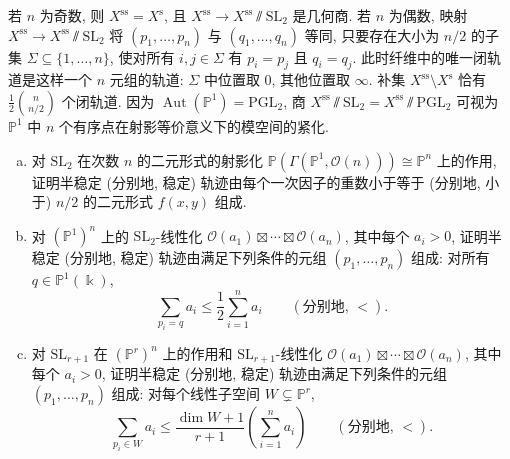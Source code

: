 \begin{example}
若 $n$ 为奇数, 则 $X^{\mathrm{ss}}=X^{\mathrm s}$, 且 $X^{\mathrm{ss}}\to X^{\mathrm{ss}}\sslash\mathrm{SL}_2$ 是几何商. 若 $n$ 为偶数, 映射 $X^{\mathrm{ss}}\to X^{\mathrm{ss}}\sslash\mathrm{SL}_2$ 将 $(p_1,\ldots,p_n)$ 与 $(q_1,\ldots,q_n)$ 等同, 只要存在大小为 $n/2$ 的子集 $\Sigma\subseteq\{1,\ldots,n\}$, 使对所有 $i,j\in\Sigma$ 有 $p_i=p_j$ 且 $q_i=q_j$. 此时纤维中的唯一闭轨道是这样一个 $n$ 元组的轨道: $\Sigma$ 中位置取 $0$, 其他位置取 $\infty$. 补集 $X^{\mathrm{ss}}\setminus X^{\mathrm s}$ 恰有 $\frac12\binom n{n/2}$ 个闭轨道. 因为 $\operatorname{Aut}(\mathbb P^1)=\mathrm{PGL}_2$, 商 $X^{\mathrm{ss}}\sslash\mathrm{SL}_2=X^{\mathrm{ss}}\sslash\mathrm{PGL}_2$ 可视为 $\mathbb P^1$ 中 $n$ 个有序点在射影等价意义下的模空间的紧化.
\end{example}
\begin{exercise}\label{src:8.5.2}
\begin{enumerate}[(a)]
\item 对 $\mathrm{SL}_2$ 在次数 $n$ 的二元形式的射影化 $\mathbb P(\Gamma(\mathbb P^1,\mathcal O(n)))\cong\mathbb P^n$ 上的作用, 证明半稳定 (分别地, 稳定) 轨迹由每个一次因子的重数小于等于 (分别地, 小于) $n/2$ 的二元形式 $f(x,y)$ 组成.
\item 对 $(\mathbb P^1)^n$ 上的 $\mathrm{SL}_2$-线性化 $\mathcal O(a_1)\boxtimes\cdots\boxtimes\mathcal O(a_n)$, 其中每个 $a_i>0$, 证明半稳定 (分别地, 稳定) 轨迹由满足下列条件的元组 $(p_1,\ldots,p_n)$ 组成: 对所有 $q\in\mathbb P^1(\Bbbk)$,
\[
\sum_{p_i=q}a_i\leq\frac12\sum_{i=1}^na_i\qquad(\text{分别地, }<).
\]
\item 对 $\mathrm{SL}_{r+1}$ 在 $(\mathbb P^r)^n$ 上的作用和 $\mathrm{SL}_{r+1}$-线性化 $\mathcal O(a_1)\boxtimes\cdots\boxtimes\mathcal O(a_n)$, 其中每个 $a_i>0$, 证明半稳定 (分别地, 稳定) 轨迹由满足下列条件的元组 $(p_1,\ldots,p_n)$ 组成: 对每个线性子空间 $W\subsetneq\mathbb P^r$,
\[
\sum_{p_i\in W}a_i\leq\frac{\dim W+1}{r+1}\left(\sum_{i=1}^na_i\right)\qquad(\text{分别地, }<).
\]
\end{enumerate}
\end{exercise}
